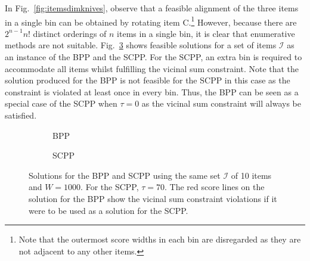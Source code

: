 \documentclass[a4paper,11pt,authoryear]{elsarticle}
\begin{document}

In Fig.~\ref{fig:itemsdimknives}, observe that a feasible alignment of the three items in a single bin can be obtained by rotating item C.\footnote{Note that the outermost score widths in each bin are disregarded as they are not adjacent to any other items.} However, because there are $2^{n-1} n!$ distinct orderings of $n$ items in a single bin, it is clear that enumerative methods are not suitable. Fig.~\ref{fig:bppvscpp} shows feasible solutions for a set of items $\mathcal{I}$ as an instance of the BPP and the SCPP. For the SCPP, an extra bin is required to accommodate all items whilst fulfilling the vicinal sum constraint. Note that the solution produced for the BPP is not feasible for the SCPP in this case as the constraint is violated at least once in every bin. Thus, the BPP can be seen as a special case of the SCPP when $\tau=0$ as the vicinal sum constraint will always be satisfied.

\begin{figure}[H]
	\centering	
	\begin{subfigure}[h]{0.42\textwidth}
		
		\caption{BPP}
		\label{fig:bpp}
	\end{subfigure} \hspace{10mm}
	\begin{subfigure}[h]{0.42\textwidth}
		
		\caption{SCPP}
		\label{fig:scpp}
	\end{subfigure}
	\caption{Solutions for the BPP and SCPP using the same set $\mathcal{I}$ of 10 items and $W = 1000$. For the SCPP, $\tau = 70$. The red score lines on the solution for the BPP show the vicinal sum constraint violations if it were to be used as a solution for the SCPP.}	
	\label{fig:bppvscpp}
\end{figure}
\end{document}
